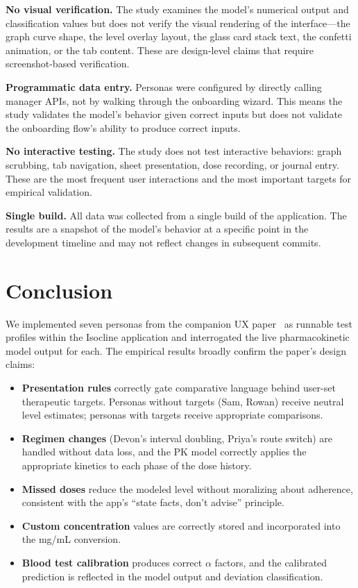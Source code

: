 \documentclass[11pt,a4paper]{article}
\begin{document}
\textbf{No visual verification.} The study examines the model's numerical
output and classification values but does not verify the visual rendering of
the interface---the graph curve shape, the level overlay layout, the glass
card stack text, the confetti animation, or the tab content. These are
design-level claims that require screenshot-based verification.

\textbf{Programmatic data entry.} Personas were configured by directly
calling manager APIs, not by walking through the onboarding wizard. This
means the study validates the model's behavior given correct inputs but does
not validate the onboarding flow's ability to produce correct inputs.

\textbf{No interactive testing.} The study does not test interactive
behaviors: graph scrubbing, tab navigation, sheet presentation, dose
recording, or journal entry. These are the most frequent user interactions
and the most important targets for empirical validation.

\textbf{Single build.} All data was collected from a single build of the
application. The results are a snapshot of the model's behavior at a
specific point in the development timeline and may not reflect changes in
subsequent commits.

\section{Conclusion}
\label{sec:conclusion}

We implemented seven personas from the companion UX paper~\cite{xtux} as
runnable test profiles within the Isocline application and interrogated the live
pharmacokinetic model output for each. The empirical results broadly confirm
the paper's design claims:

\begin{itemize}[nosep,leftmargin=1.4em]
\item \textbf{Presentation rules} correctly gate comparative language behind
  user-set therapeutic targets. Personas without targets (Sam, Rowan)
  receive neutral level estimates; personas with targets receive appropriate
  comparisons.
\item \textbf{Regimen changes} (Devon's interval doubling, Priya's route
  switch) are handled without data loss, and the PK model correctly applies
  the appropriate kinetics to each phase of the dose history.
\item \textbf{Missed doses} reduce the modeled level without moralizing
  about adherence, consistent with the app's ``state facts, don't advise''
  principle.
\item \textbf{Custom concentration} values are correctly stored and
  incorporated into the mg/mL conversion.
\item \textbf{Blood test calibration} produces correct $\alpha$ factors,
  and the calibrated prediction is reflected in the model output and
  deviation classification.
\end{itemize}
\end{document}
